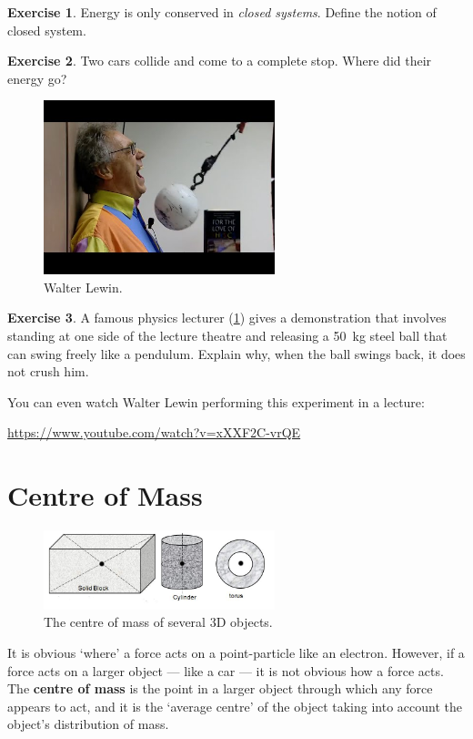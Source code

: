 \documentclass[a4paper]{amsbook}
\newcommand{\goandwatch}[1]{
\begin{center}
\begin{tcolorbox}[width=0.8\textwidth,colback={SkyBlue!20},title={\textbf{Go and watch...}},colbacktitle=MidnightBlue,coltitle=White]
  \textcolor{MidnightBlue}{\url{#1}}
\end{tcolorbox}
\end{center}}
\theoremstyle{definition}
\newtheorem{exercise}{Exercise}
\numberwithin{exercise}{chapter}
\numberwithin{exercise}{chapter}
\begin{document}
\begin{exercise}
  Energy is only conserved in \textit{closed systems}. Define the notion of closed system.
\end{exercise}

\begin{exercise}
  Two cars collide and come to a complete stop. Where did their energy go?
\end{exercise}

\begin{figure}
  \centering
  \includegraphics[width=0.6\textwidth]{lewin}
  \caption{Walter Lewin.}\label{fig:lewin}
\end{figure}

\begin{exercise}
  A famous physics lecturer (\cref{fig:lewin}) gives a demonstration that involves standing at one side of the lecture theatre
  and releasing a \SI{50}{\kilo\gram} steel ball that can swing freely like a pendulum. Explain why, when the
  ball swings back, it does not crush him.
\end{exercise}

You can even watch Walter Lewin performing this experiment in a lecture:
\goandwatch{https://www.youtube.com/watch?v=xXXF2C-vrQE}

\section{Centre of Mass}
\begin{figure}
  \centering
  \includegraphics[width=0.6\textwidth]{centreofmass2}
  \caption{The centre of mass of several 3D objects.}\label{fig:centreofmass2}
\end{figure}
It is obvious `where' a force acts on a point-particle like an electron. However, if a force acts on a larger object --- like a car --- it is
not obvious how a force acts. The \textbf{centre of mass} is the point in a larger object through which any force appears to act, and it is
the `average centre' of the object taking into account the object's distribution of mass.
\end{document}
